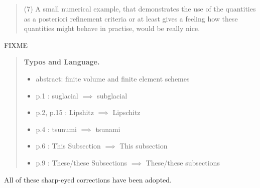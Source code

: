 \documentclass[12pt]{amsart}
\newcommand{\mm}{\medskip \noindent}
\begin{document}
\begin{quote}
\mm (7) A small numerical example, that demonstrates the use of the quantities as a posteriori refinement criteria or at least gives a feeling how these quantities might behave in practise, would be really nice.
\end{quote}

FIXME

\begin{quote}
\textbf{Typos and Language.}

\begin{itemize}
\item abstract: finite volume and finite element schemes
\item p.1 : suglacial $\implies$ subglacial
\item p.2, p.15 : Lipshitz $\implies$ Lipschitz
\item p.4 : tsunumi $\implies$ tsunami
\item p.6 : This Subsection $\implies$ This subsection
\item p.9 : These/these Subsections $\implies$ These/these subsections
\end{itemize}
\end{quote}

All of these sharp-eyed corrections have been adopted.
\end{document}

